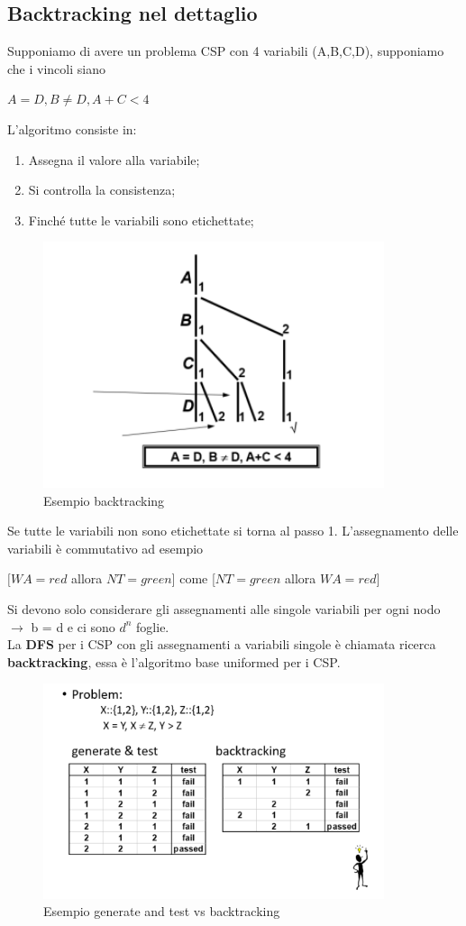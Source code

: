 \subsection{Backtracking nel dettaglio}
Supponiamo di avere un problema CSP con 4 variabili (A,B,C,D), supponiamo che i vincoli siano
\begin{center}
    $A = D, B \neq D, A + C < 4$
\end{center}
L'algoritmo consiste in:
\begin{enumerate}
    \item Assegna il valore alla variabile;
    \item Si controlla la consistenza;
    \item Finché tutte le variabili sono etichettate;
\end{enumerate}
\begin{figure}[H]
    \centering
    \includegraphics[width=10cm, keepaspectratio]{img/Cap2/back1.png}
    \caption{Esempio backtracking}
\end{figure}
Se tutte le variabili non sono etichettate si torna al passo 1. L'assegnamento delle variabili è commutativo ad esempio
\begin{center}
    $[WA = red$ allora $NT = green]$ come [$NT=green$ allora $WA =red]$
\end{center}


Si devono solo considerare gli assegnamenti alle singole variabili per ogni nodo $\rightarrow$ b = d
e ci sono $d^n$ foglie.
\\La \textbf{DFS} per i CSP con gli assegnamenti a variabili singole è chiamata ricerca \textbf{backtracking}, essa è l'algoritmo base uniformed per i CSP.
\begin{figure}[H]
    \centering
    \includegraphics[width=10cm, keepaspectratio]{img/Cap2/back2.png}
    \caption{Esempio generate and test vs backtracking}
\end{figure}

